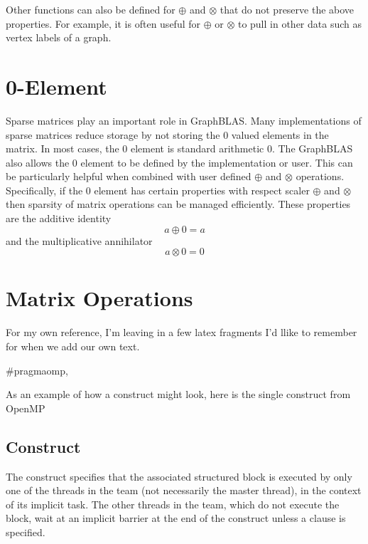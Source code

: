   Other functions can also be defined for $\oplus$ and $\otimes$ that do not preserve the above properties.  For example, it is often useful for $\oplus$ or $\otimes$ to pull in other data such as vertex labels of a graph. 
  
\section{0-Element}
  Sparse matrices play an important role in GraphBLAS.  Many implementations of sparse matrices reduce storage by not storing the 0 valued elements in the matrix.  In most cases, the 0 element is standard arithmetic 0.  The GraphBLAS also allows the 0 element to be defined by the implementation or user.  This can be particularly helpful when combined with user defined $\oplus$ and $\otimes$ operations.  Specifically, if the 0 element has certain properties with respect scaler $\oplus$ and $\otimes$ then sparsity of matrix operations can be managed efficiently.  These properties are the additive identity
$$
     a \oplus 0 = a
$$
and the multiplicative annihilator
$$
     a \otimes 0 = 0
$$

\section{Matrix Operations}


For my own reference, I'm leaving in a few latex fragments I'd llike to remember for when we add our own text.


\begin{boxedcode}
\#pragma\plc{ }omp\plc{ directive-name [clause[ [},\plc{] clause] ... ] new-line}
\end{boxedcode}

As an example of how a construct might look, here is the single construct from OpenMP

\subsection{ Construct}
\label{subsec:single Construct}
\summary
The  construct specifies that the associated structured block is executed by only 
one of the threads in the team (not necessarily the master thread), in the context of its 
implicit task. The other threads in the team, which do not execute the block, wait at an 
implicit barrier at the end of the  construct unless a  clause is specified.

